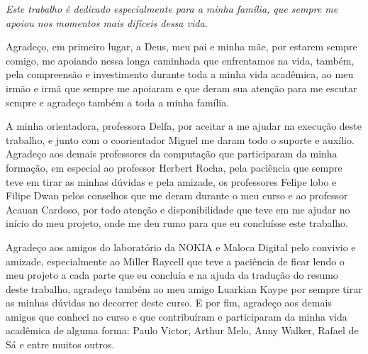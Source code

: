 \documentclass[
	12pt,				%
    oneside,			%
	a4paper,			%
	chapter=TITLE,		%
	english,			%
	brazil				%
	]{abntex2}
\begin{document}
\frenchspacing 


\imprimircapa

\imprimirfolhaderosto

\imprimirfolhadeaprovacao
\begin{dedicatoria}
   \vspace*{\fill}
   \centering
   \noindent
   \textit{Este trabalho é dedicado especialmente para a minha família, que sempre me apoiou nos momentos mais difíceis dessa vida.} \vspace*{\fill}
\end{dedicatoria}

\begin{agradecimentos}
Agradeço, em primeiro lugar, a Deus, meu pai e minha mãe, por estarem sempre comigo, me apoiando nessa longa caminhada que enfrentamos na vida, também, pela compreensão e investimento durante toda a minha vida acadêmica, ao meu irmão e irmã que sempre me apoiaram e que deram sua atenção para me escutar sempre e agradeço também a toda a minha família.
\par
A minha orientadora, professora Delfa, por aceitar a me ajudar na execução deste trabalho, e junto com o coorientador Miguel me daram todo o suporte e auxílio. Agradeço aos demais professores da computação que participaram da minha formação, em especial ao professor Herbert Rocha, pela paciência que sempre teve em tirar as minhas dúvidas e pela amizade, os professores Felipe lobo e Filipe Dwan pelos conselhos que me deram durante o meu curso e ao professor Acauan Cardoso, por todo atenção e disponibilidade que teve em me ajudar no início do meu projeto, onde me deu rumo para que eu concluísse este trabalho.
\par
Agradeço aos amigos do laboratório da NOKIA e Maloca Digital pelo convivio e amizade, especialmente ao Miller Raycell que teve a paciência de ficar lendo o meu projeto a cada parte que eu concluía e na ajuda da tradução do resumo deste trabalho, agradeço também ao meu amigo Luarkian Kaype por sempre tirar as minhas dúvidas no decorrer deste curso. E por fim, agradeço aos demais amigos que conheci no curso e que contribuíram e participaram da minha vida acadêmica de alguma forma: Paulo Victor, Arthur Melo, Anny Walker, Rafael de Sá e entre muitos outros.




\end{agradecimentos}
\end{document}
